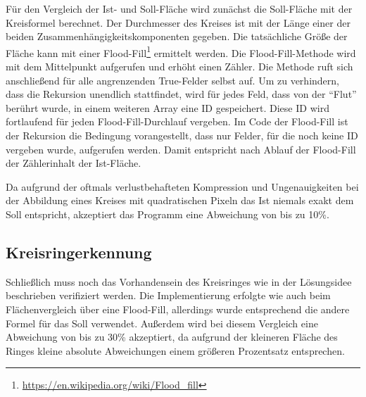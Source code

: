 Für den Vergleich der Ist- und Soll-Fläche wird zunächst die Soll-Fläche mit der Kreisformel berechnet. Der Durchmesser des Kreises ist mit der Länge einer der beiden Zusammenhängigkeitskomponenten gegeben. Die tatsächliche Größe der Fläche kann mit einer Flood-Fill\footnote{\url{https://en.wikipedia.org/wiki/Flood_fill}} ermittelt werden.
Die Flood-Fill-Methode wird mit dem Mittelpunkt aufgerufen und erhöht einen Zähler. Die Methode ruft sich anschließend für alle angrenzenden True-Felder selbst auf. Um zu verhindern, dass die Rekursion unendlich stattfindet, wird für jedes Feld, dass von der "`Flut"' berührt wurde, in einem weiteren Array eine ID gespeichert.
Diese ID wird fortlaufend für jeden Flood-Fill-Durchlauf vergeben. Im Code der Flood-Fill ist der Rekursion die Bedingung vorangestellt, dass nur Felder, für die noch keine ID vergeben wurde, aufgerufen werden. Damit entspricht nach Ablauf der Flood-Fill der Zählerinhalt der Ist-Fläche.

Da aufgrund der oftmals verlustbehafteten Kompression und Ungenauigkeiten bei der Abbildung eines Kreises mit quadratischen Pixeln das Ist niemals exakt dem Soll entspricht, akzeptiert das Programm eine Abweichung von bis zu 10\%. 

\subsection{Kreisringerkennung}
Schließlich muss noch das Vorhandensein des Kreisringes wie in der Lösungsidee beschrieben verifiziert werden. Die Implementierung erfolgte wie auch beim Flächenvergleich über eine Flood-Fill, allerdings wurde entsprechend die andere Formel für das Soll verwendet. Außerdem wird bei diesem Vergleich eine Abweichung von bis zu 30\% akzeptiert, da aufgrund der kleineren Fläche des Ringes kleine absolute Abweichungen einem größeren Prozentsatz entsprechen.

\pagebreak
